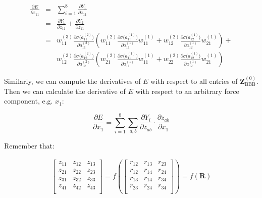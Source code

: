 \begin{eqnarray}
\frac{\partial{E}}{\partial{z_{11}}} 
& = &
\sum_{i=1}^8{
	\frac{\partial{Y_i}}{\partial{z_{11}}}
} \nonumber \\
& = &
\frac{\partial{Y_1}}{\partial{z_{11}}} + \frac{\partial{Y_2}}{\partial{z_{11}}} \\
& = & 
w^{(3)}_{11}\frac{\partial{\sigma(a_{11}^{(2)}})}{\partial{a_{11}^{(2)}}} 
\left(
	w_{11}^{(2)}\frac{\partial{\sigma(a_{11}^{(1)}})}{\partial{a_{11}^{(1)}}}w^{(1)}_{11} +
	w_{12}^{(2)}\frac{\partial{\sigma(a_{12}^{(1)}})}{\partial{a_{12}^{(1)}}}w^{(1)}_{21}  
\right) + \nonumber \\
&& 
w^{(3)}_{12}\frac{\partial{\sigma(a_{12}^{(2)}})}{\partial{a_{12}^{(2)}}} 
\left(
	w_{21}^{(2)}\frac{\partial{\sigma(a_{11}^{(1)}})}{\partial{a_{11}^{(1)}}}w^{(1)}_{11} +
	w_{22}^{(2)}\frac{\partial{\sigma(a_{12}^{(1)}})}{\partial{a_{12}^{(1)}}}w^{(1)}_{21}  
\right)
\end{eqnarray} 

\noindent Similarly, we can compute the derivatives of $E$ with respect to all entries of 
$\mathbf{Z}^{(0)}_{\mathrm{BBB}}$. Then we can calculate the derivative of $E$ with respect 
to an arbitrary force component, e.g. $x_1$:

\begin{equation}\label{dE_dYdz_dzdx}
\frac{\partial{E}}{\partial{x_1}} = \sum_{i=1}^{8}{
	\sum_{a,b}{
		\frac{\partial{Y_{i}}}{\partial{z_{ab}}} 
		\cdot 
		\frac{\partial{z_{ab}}}{\partial{x_{1}}}
	}
}
\end{equation}

\noindent Remember that:

\begin{eqnarray}
\left[\begin{array}{ccc}
	z_{11} & z_{12}   & z_{13}   \\
	z_{21} & z_{22}   & z_{23}   \\
	z_{31} & z_{32}   & z_{33}   \\
	z_{41} & z_{42}   & z_{43}   \\
\end{array}\right] =
f(\left[\begin{array}{ccc}
	r_{12} & r_{13}   & r_{23}   \\
	r_{12} & r_{14}   & r_{24}   \\
	r_{13} & r_{14}   & r_{34}   \\
	r_{23} & r_{24}   & r_{34}   \\
\end{array}
\right]) = f(\mathbf{R})
\end{eqnarray}

